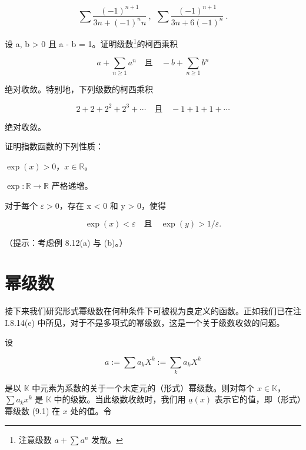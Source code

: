 \begin{exercises}
\[
\sum\frac{(-1)^{n+1}}{3n+(-1)^{n}n}~,~~\sum\frac{(-1)^{n+1}}{3n+6(-1)^{n}}~.
\]
\item

设 a, b > 0 且 a - b = 1。证明级数\footnote{注意级数 $a+\sum a^n$ 发散。}的柯西乘积

\[
a+\sum_{n\geq1}a^{n}\quad\text{且}\quad-b+\sum_{n\geq1}b^{n}
\]

绝对收敛。特别地，下列级数的柯西乘积

\[
2+2+2^{2}+2^{3}+\cdots\quad\text{且}\quad-1+1+1+\cdots
\]

绝对收敛。

\item

证明指数函数的下列性质：

\begin{items}
\item

$ \exp(x) > 0 $，$ x \in \mathbb{R} $。

\item

$ \exp: \mathbb{R} \to \mathbb{R} $ 严格递增。

\item

对于每个 $ \varepsilon > 0 $，存在 x < 0 和 y > 0，使得

\[
\exp(x)<\varepsilon\quad\text{且}\quad\exp(y)>1/\varepsilon.
\]

（提示：考虑例 8.12(a) 与 (b)。）

\end{items}

\end{exercises}

\section{幂级数}

接下来我们研究形式幂级数在何种条件下可被视为良定义的函数。正如我们已在注 I.8.14(e) 中所见，对于不是多项式的幂级数，这是一个关于级数收敛的问题。

设

\begin{equation}
a:=\sum a_{k}X^{k}:=\sum_{k}a_{k}X^{k}
\end{equation}

是以  $ \mathbb{K} $ 中元素为系数的关于一个未定元的（形式）幂级数。则对每个  $ x \in \mathbb{K} $， $ \sum a_k x^k $ 是  $ \mathbb{K} $ 中的级数。当此级数收敛时，我们用  $ \underline{a}(x) $ 表示它的值，即（形式）幂级数 (9.1) 在  $ x $ 处的值。令

